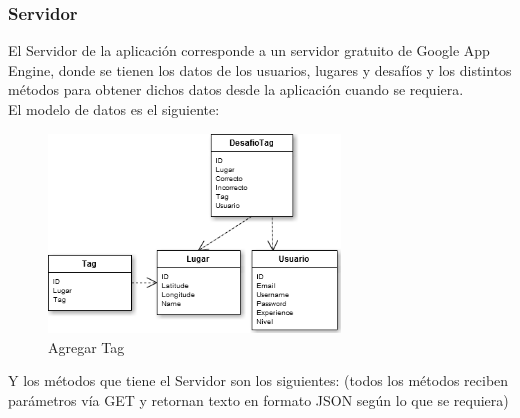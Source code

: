 \documentclass[10pt,letterpaper]{article}
\begin{document}
\subsubsection{Servidor}

El Servidor de la aplicación corresponde a un servidor gratuito de Google App Engine, donde se tienen los datos de los usuarios, lugares y desafíos y los distintos métodos para obtener dichos datos desde la aplicación cuando se requiera.\\

El modelo de datos es el siguiente:\\

\begin{figure}[h]
\begin{center}
\includegraphics[width=220pt]{./imgs/ModeloDatos.png}
\caption{Agregar Tag}
\end{center}
\end{figure}

Y los métodos que tiene el Servidor son los siguientes: (todos los métodos reciben parámetros vía GET y retornan texto en formato JSON según lo que se requiera)\\
\end{document}
